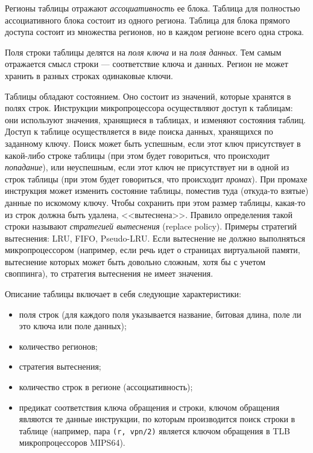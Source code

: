 \documentclass[14pt]{extreport}
\newcommand{\LRU}{\textsf{LRU}\xspace}
\newcommand{\FIFO}{\textsf{FIFO}\xspace}
\newcommand{\PseudoLRU}{\textsf{Pseudo-LRU}\xspace}
\begin{document}
Регионы таблицы отражают \emph{ассоциативность} ее блока. Таблица для полностью ассоциативного блока состоит из одного региона. Таблица для блока прямого доступа состоит из множества регионов, но в каждом регионе всего одна строка.

Поля строки таблицы делятся на \emph{поля ключа} и на \emph{поля данных}. Тем самым отражается смысл строки --- соответствие ключа и данных. Регион не может хранить в разных строках одинаковые ключи.

Таблицы обладают состоянием. Оно состоит из значений, которые хранятся в полях строк. Инструкции микропроцессора осуществляют доступ к таблицам: они используют значения, хранящиеся в таблицах, и изменяют состояния таблиц. Доступ к таблице осуществляется в виде поиска данных, хранящихся по заданному ключу. Поиск может быть успешным, если этот ключ присутствует в какой-либо строке таблицы (при этом будет говориться, что происходит \emph{попадание}), или неуспешным, если этот ключ не присутствует ни в одной из строк таблицы (при этом будет говориться, что происходит \emph{промах}). При промахе инструкция может изменить состояние таблицы, поместив туда (откуда-то взятые) данные по искомому ключу. Чтобы сохранить при этом размер таблицы, какая-то из строк должна быть удалена, <<вытеснена>>. Правило определения такой строки называют \emph{стратегией вытеснения} (replace policy). Примеры стратегий вытеснения: \LRU, \FIFO, \PseudoLRU. Если вытеснение не должно выполняться микропроцессором (например, если речь идет о страницах виртуальной памяти, вытеснение которых может быть довольно сложным, хотя бы с учетом своппинга), то стратегия вытеснения не имеет значения.

Описание таблицы включает в себя следующие характеристики:
\begin{itemize}
    \item поля строк (для каждого поля указывается название, битовая длина, поле ли это ключа или поле данных);
    \item количество регионов;
    \item стратегия вытеснения;
    \item количество строк в регионе (ассоциативность);
    \item предикат соответствия ключа обращения и строки, ключом обращения являются те данные инструкции, по которым производится поиск строки в таблице (например, пара \texttt{(r, vpn/2)} является ключом обращения в TLB микропроцессоров MIPS64).
\end{itemize}
\end{document}
